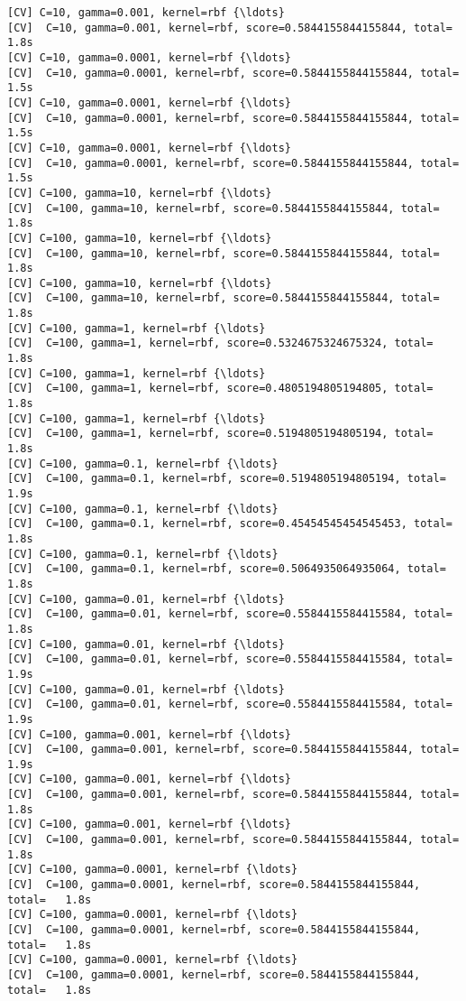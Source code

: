 \documentclass[11pt]{article}
\begin{document}
\begin{Verbatim}[commandchars=\\\{\}]
[CV] C=10, gamma=0.001, kernel=rbf {\ldots}
[CV]  C=10, gamma=0.001, kernel=rbf, score=0.5844155844155844, total=   1.8s
[CV] C=10, gamma=0.0001, kernel=rbf {\ldots}
[CV]  C=10, gamma=0.0001, kernel=rbf, score=0.5844155844155844, total=   1.5s
[CV] C=10, gamma=0.0001, kernel=rbf {\ldots}
[CV]  C=10, gamma=0.0001, kernel=rbf, score=0.5844155844155844, total=   1.5s
[CV] C=10, gamma=0.0001, kernel=rbf {\ldots}
[CV]  C=10, gamma=0.0001, kernel=rbf, score=0.5844155844155844, total=   1.5s
[CV] C=100, gamma=10, kernel=rbf {\ldots}
[CV]  C=100, gamma=10, kernel=rbf, score=0.5844155844155844, total=   1.8s
[CV] C=100, gamma=10, kernel=rbf {\ldots}
[CV]  C=100, gamma=10, kernel=rbf, score=0.5844155844155844, total=   1.8s
[CV] C=100, gamma=10, kernel=rbf {\ldots}
[CV]  C=100, gamma=10, kernel=rbf, score=0.5844155844155844, total=   1.8s
[CV] C=100, gamma=1, kernel=rbf {\ldots}
[CV]  C=100, gamma=1, kernel=rbf, score=0.5324675324675324, total=   1.8s
[CV] C=100, gamma=1, kernel=rbf {\ldots}
[CV]  C=100, gamma=1, kernel=rbf, score=0.4805194805194805, total=   1.8s
[CV] C=100, gamma=1, kernel=rbf {\ldots}
[CV]  C=100, gamma=1, kernel=rbf, score=0.5194805194805194, total=   1.8s
[CV] C=100, gamma=0.1, kernel=rbf {\ldots}
[CV]  C=100, gamma=0.1, kernel=rbf, score=0.5194805194805194, total=   1.9s
[CV] C=100, gamma=0.1, kernel=rbf {\ldots}
[CV]  C=100, gamma=0.1, kernel=rbf, score=0.45454545454545453, total=   1.8s
[CV] C=100, gamma=0.1, kernel=rbf {\ldots}
[CV]  C=100, gamma=0.1, kernel=rbf, score=0.5064935064935064, total=   1.8s
[CV] C=100, gamma=0.01, kernel=rbf {\ldots}
[CV]  C=100, gamma=0.01, kernel=rbf, score=0.5584415584415584, total=   1.8s
[CV] C=100, gamma=0.01, kernel=rbf {\ldots}
[CV]  C=100, gamma=0.01, kernel=rbf, score=0.5584415584415584, total=   1.9s
[CV] C=100, gamma=0.01, kernel=rbf {\ldots}
[CV]  C=100, gamma=0.01, kernel=rbf, score=0.5584415584415584, total=   1.9s
[CV] C=100, gamma=0.001, kernel=rbf {\ldots}
[CV]  C=100, gamma=0.001, kernel=rbf, score=0.5844155844155844, total=   1.9s
[CV] C=100, gamma=0.001, kernel=rbf {\ldots}
[CV]  C=100, gamma=0.001, kernel=rbf, score=0.5844155844155844, total=   1.8s
[CV] C=100, gamma=0.001, kernel=rbf {\ldots}
[CV]  C=100, gamma=0.001, kernel=rbf, score=0.5844155844155844, total=   1.8s
[CV] C=100, gamma=0.0001, kernel=rbf {\ldots}
[CV]  C=100, gamma=0.0001, kernel=rbf, score=0.5844155844155844, total=   1.8s
[CV] C=100, gamma=0.0001, kernel=rbf {\ldots}
[CV]  C=100, gamma=0.0001, kernel=rbf, score=0.5844155844155844, total=   1.8s
[CV] C=100, gamma=0.0001, kernel=rbf {\ldots}
[CV]  C=100, gamma=0.0001, kernel=rbf, score=0.5844155844155844, total=   1.8s

\end{Verbatim}
\end{document}
